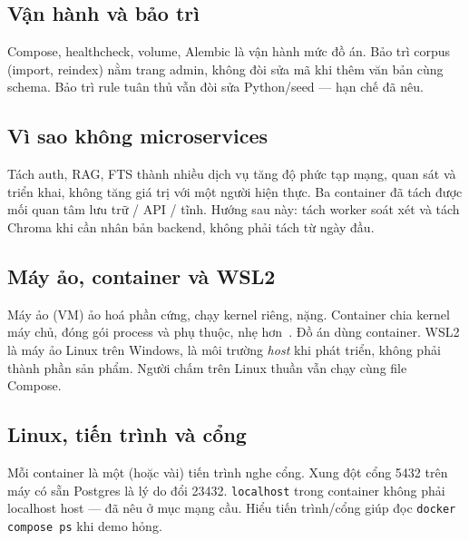 \subsection{Vận hành và bảo trì}

Compose, healthcheck, volume, Alembic là vận hành mức đồ án. Bảo trì corpus
(import, reindex) nằm trang admin, không đòi sửa mã khi thêm văn bản cùng schema.
Bảo trì rule tuân thủ vẫn đòi sửa Python/seed --- hạn chế đã nêu.

\subsection{Vì sao không microservices}

Tách auth, RAG, FTS thành nhiều dịch vụ tăng độ phức tạp mạng, quan sát và triển
khai, không tăng giá trị với một người hiện thực. Ba container đã tách được mối
quan tâm lưu trữ / API / tĩnh. Hướng sau này: tách worker soát xét và tách Chroma
khi cần nhân bản backend, không phải tách từ ngày đầu.

\subsection{Máy ảo, container và WSL2}

Máy ảo (VM) ảo hoá phần cứng, chạy kernel riêng, nặng. Container chia kernel
máy chủ, đóng gói process và phụ thuộc, nhẹ hơn~\cite{docker}. Đồ án dùng
container. WSL2 là máy ảo Linux trên Windows, là môi trường \emph{host} khi phát
triển, không phải thành phần sản phẩm. Người chấm trên Linux thuần vẫn chạy
cùng file Compose.

\subsection{Linux, tiến trình và cổng}

Mỗi container là một (hoặc vài) tiến trình nghe cổng. Xung đột cổng 5432 trên
máy có sẵn Postgres là lý do đổi 23432. \texttt{localhost} trong container không
phải localhost host --- đã nêu ở mục mạng cầu. Hiểu tiến trình/cổng giúp đọc
\texttt{docker compose ps} khi demo hỏng.
